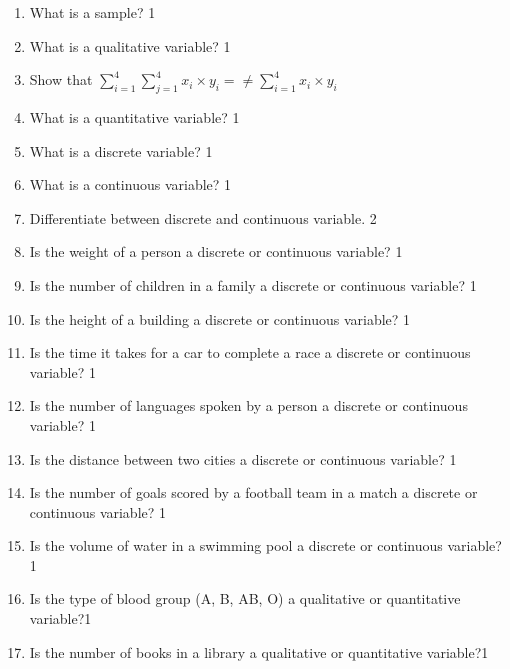 \documentclass[a4paper,oneside]{book}
\begin{document}
\begin{enumerate}
\item What is a sample? \hfill 1

\item What is a qualitative variable? \hfill 1

\item Show that $\displaystyle \sum_{i=1}^4 \sum_{j=1}^4 x_i \times y_i= \neq \sum_{i=1}^4 x_i \times y_i$

\item What is a quantitative variable? \hfill 1

\item What is a discrete variable? \hfill 1

\item What is a continuous variable? \hfill 1

\item Differentiate between discrete and continuous variable. \hfill 2
\item Is the weight of a person a discrete or continuous variable? \hfill 1

\item Is the number of children in a family a discrete or continuous variable? \hfill 1

\item Is the height of a building a discrete or continuous variable? \hfill 1

\item Is the time it takes for a car to complete a race a discrete or continuous variable? \hfill 1

\item Is the number of languages spoken by a person a discrete or continuous variable? \hfill 1

\item Is the distance between two cities a discrete or continuous variable? \hfill 1


\item Is the number of goals scored by a football team in a match a discrete 
or continuous variable? \hfill 1

\item Is the volume of water in a swimming pool a discrete or continuous 
variable? \hfill 1

\item Is the type of blood group (A, B, AB, O) a qualitative or 
quantitative variable?\hfill 1

\item Is the number of books in a library a qualitative or quantitative 
variable?\hfill 1


\end{enumerate}
\end{document}
